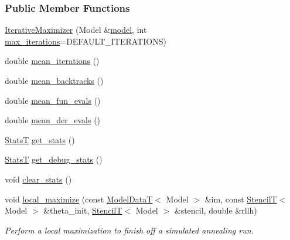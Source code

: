 \subsubsection*{Public Member Functions}
\begin{DoxyCompactItemize}
\item 
\hyperlink{classmappel_1_1IterativeMaximizer_a494fa3b22af257f518db038d033c38a7}{Iterative\+Maximizer} (Model \&\hyperlink{classmappel_1_1Estimator_a8322546d87ccdf01f8b0dcd9dae509f0}{model}, int \hyperlink{classmappel_1_1IterativeMaximizer_ac888935f332b069836a559f44cd267c7}{max\+\_\+iterations}=D\+E\+F\+A\+U\+L\+T\+\_\+\+I\+T\+E\+R\+A\+T\+I\+O\+NS)
\item 
double \hyperlink{classmappel_1_1IterativeMaximizer_ae280c757d1b614dafe87200c7ed8681a}{mean\+\_\+iterations} ()
\item 
double \hyperlink{classmappel_1_1IterativeMaximizer_aac69dd736d791e2ee10cc0fa40454ee5}{mean\+\_\+backtracks} ()
\item 
double \hyperlink{classmappel_1_1IterativeMaximizer_ad66c3997d62ee2261637482f68906ef9}{mean\+\_\+fun\+\_\+evals} ()
\item 
double \hyperlink{classmappel_1_1IterativeMaximizer_ac852178ec09b7253b5b63f5300bf77a2}{mean\+\_\+der\+\_\+evals} ()
\item 
\hyperlink{namespacemappel_a04ab395b0cf82c4ce68a36b2212649a5}{StatsT} \hyperlink{classmappel_1_1IterativeMaximizer_a22783dc49fb4fd6e754b0d0ee161c543}{get\+\_\+stats} ()
\item 
\hyperlink{namespacemappel_a04ab395b0cf82c4ce68a36b2212649a5}{StatsT} \hyperlink{classmappel_1_1IterativeMaximizer_a1d9c29b69f468200a90bcd68adfb5643}{get\+\_\+debug\+\_\+stats} ()
\item 
void \hyperlink{classmappel_1_1IterativeMaximizer_af709331a98863a0d8a4003047f2b70a2}{clear\+\_\+stats} ()
\item 
void \hyperlink{classmappel_1_1IterativeMaximizer_a452cb0415d5b30de4176fcb63bf4c58b}{local\+\_\+maximize} (const \hyperlink{namespacemappel_a97f050df953605381ae9c901c3b125f1}{Model\+DataT}$<$ Model $>$ \&im, const \hyperlink{namespacemappel_a3a06598240007876f8c4bf834ad86197}{StencilT}$<$ Model $>$ \&theta\+\_\+init, \hyperlink{namespacemappel_a3a06598240007876f8c4bf834ad86197}{StencilT}$<$ Model $>$ \&stencil, double \&rllh)
\begin{DoxyCompactList}\small\item\em Perform a local maximization to finish off a simulated annealing run. \end{DoxyCompactList}\item 

\end{DoxyCompactItemize}
